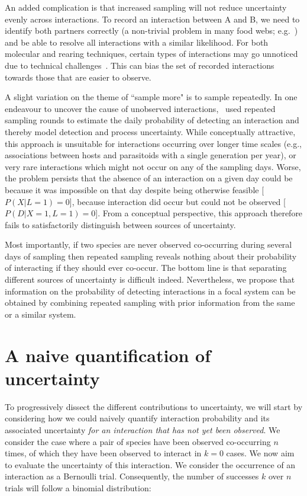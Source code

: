 \documentclass[12pt]{article}
\begin{document}
\begin{spacing}{2.0}
    An added complication is that increased sampling will not reduce uncertainty evenly across interactions. To record an interaction between A and B, we need to identify both partners correctly (a non-trivial problem in many food webs; e.g.~\citealp{Kaartinen2011,Roslin2016}) and be able to resolve all interactions with a similar likelihood. For both molecular and rearing techniques, certain types of interactions may go unnoticed due to technical challenges~\citep{Wirta2014}. This can bias the set of recorded interactions towards those that are easier to observe.


    A slight variation on the theme of ``sample more" is to sample repeatedly. In one endeavour to uncover the cause of unobserved interactions,~\citet{Weinstein2017} used repeated sampling rounds to estimate the daily probability of detecting an interaction and thereby model detection and process uncertainty. While conceptually attractive, this approach is unsuitable for interactions occurring over longer time scales (e.g., associations between hosts and parasitoids with a single generation per year), or very rare interactions which might not occur on any of the sampling days. Worse, the problem persists that the absence of an interaction on a given day could be because it was impossible on that day despite being otherwise feasible [$P(X|L=1)=0$], because interaction did occur but could not be observed [$P(D|X=1,L=1)=0$]. From a conceptual perspective, this approach therefore fails to satisfactorily distinguish between sources of uncertainty. 


    Most importantly, if two species are never observed co-occurring during several days of sampling then repeated sampling reveals nothing about their probability of interacting if they should ever co-occur. The bottom line is that separating different sources of uncertainty is difficult indeed. Nevertheless, we propose that information on the probability of detecting interactions in a focal system can be obtained by combining repeated sampling with prior information from the same or a similar system.


\section*{A naive quantification of uncertainty}

  To progressively dissect the different contributions to uncertainty, we will start by considering how we could naively quantify interaction probability and its associated uncertainty \emph{for an interaction that has not yet been observed}. We consider the case where a pair of species have been observed co-occurring $n$ times, of which they have been observed to interact in $k = 0$ cases. We now aim to evaluate the uncertainty of this interaction. We consider the occurrence of an interaction as a Bernoulli trial. Consequently, the number of successes $k$ over $n$ trials will follow a binomial distribution: 
      

\end{spacing}
\end{document}
